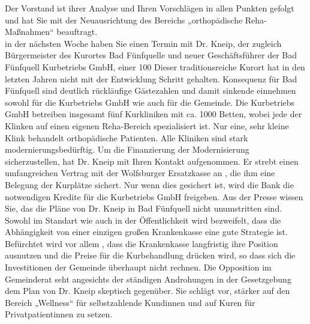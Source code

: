 Der Vorstand ist ihrer Analyse und Ihren Vorschlägen in allen Punkten gefolgt und hat Sie mit der Neuausrichtung des Bereichs „orthopädische Reha-Maßnahmen“ beauftragt.
\\
in der nächsten Woche haben Sie einen Termin mit Dr. Kneip, der zugleich Bürgermeister des Kurortes Bad Fünfquelle und neuer Geschäftsführer der Bad Fünfquell Kurbetriebs GmbH, einer 100%
Dieser traditionsreiche Kurort hat in den letzten Jahren nicht mit der Entwicklung Schritt gehalten. Konsequenz für Bad Fünfquell sind deutlich rückläufige Gästezahlen und damit sinkende einnehmen sowohl für die  Kurbetriebs GmbH wie auch für die Gemeinde. Die Kurbetriebs GmbH betreiben insgesamt fünf Kurkliniken mit ca. 1000 Betten, wobei jede der Klinken auf einen eigenen Reha-Bereich spezialisiert ist. Nur eine, sehr kleine Klink behandelt orthopädische Patienten. Alle Kliniken sind stark modernierungsbedürftig.
Um die Finanzierung der Modernisierung sicherzustellen, hat Dr. Kneip mit Ihren Kontakt aufgenommen. Er strebt einen umfangreichen Vertrag mit der Wolfsburger Ersatzkasse an , die ihm eine Belegung der Kurplätze sichert. Nur wenn dies gesichert ist, wird die Bank die notwendigen Kredite für die Kurbetriebs GmbH freigeben.
Aus der Presse wissen Sie, das die Pläne von Dr. Kneip in Bad Fünfquell nicht unumstritten sind. Sowohl im Standart wie auch in der Öffentlichkeit wird bezweifelt, dass die Abhängigkeit von einer einzigen großen Krankenkasse eine gute Strategie ist. Befürchtet wird vor allem , dass die Krankenkasse langfristig ihre Position ausnutzen und die Preise für die Kurbehandlung drücken wird, so dass sich die Investitionen der Gemeinde überhaupt nicht rechnen. Die Opposition im Gemeinderat seht angesichts der ständigen Androhungen in der Gesetzgebung dem Plan von Dr. Kneip skeptisch gegenüber. Sie schlägt vor, stärker auf den Bereich „Wellness“ für selbstzahlende Kundinnen und auf Kuren für Privatpatientinnen zu setzen. 

